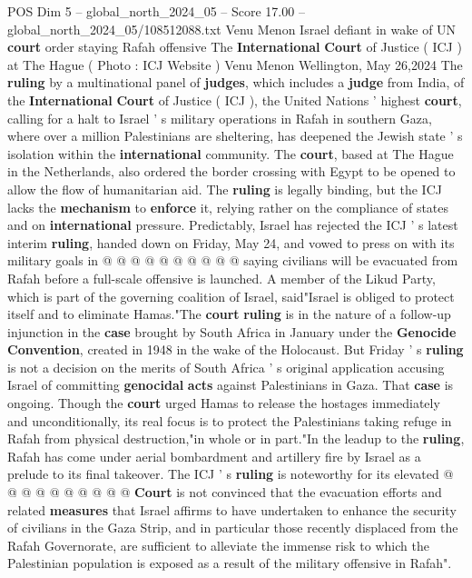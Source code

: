 \begin{textsample}{POS Dim 5 – global\_north\_2024\_05 – Score 17.00 – global\_north\_2024\_05/108512088.txt}  \label{ex:f5_pos_177}
Venu Menon Israel defiant in wake of UN \textbf{court} order staying Rafah offensive The \textbf{International} \textbf{Court} of Justice ( ICJ ) at The Hague ( Photo : ICJ Website ) Venu Menon Wellington, May 26,2024 The \textbf{ruling} by a multinational panel of \textbf{judges}, which includes a \textbf{judge} from India, of the \textbf{International} \textbf{Court} of Justice ( ICJ ), the United Nations ' highest \textbf{court}, calling for a halt to Israel ' s military operations in Rafah in southern Gaza, where over a million Palestinians are sheltering, has deepened the Jewish state ' s isolation within the \textbf{international} community.
The \textbf{court}, based at The Hague in the Netherlands, also ordered the border crossing with Egypt to be opened to allow the flow of humanitarian aid.
The \textbf{ruling} is legally binding, but the ICJ lacks the \textbf{mechanism} to \textbf{enforce} it, relying rather on the compliance of states and on \textbf{international} pressure.
Predictably, Israel has rejected the ICJ ' s latest interim \textbf{ruling}, handed down on Friday, May 24, and vowed to press on with its military goals in @ @ @ @ @ @ @ @ @ @ saying civilians will be evacuated from Rafah before a full-scale offensive is launched.
A member of the Likud Party, which is part of the governing coalition of Israel, said"Israel is obliged to protect itself and to eliminate Hamas."The \textbf{court} \textbf{ruling} is in the nature of a follow-up injunction in the \textbf{case} brought by South Africa in January under the \textbf{Genocide} \textbf{Convention}, created in 1948 in the wake of the Holocaust.
But Friday ' s \textbf{ruling} is not a decision on the merits of South Africa ' s original application accusing Israel of committing \textbf{genocidal} \textbf{acts} against Palestinians in Gaza.
That \textbf{case} is ongoing.
Though the \textbf{court} urged Hamas to release the hostages immediately and unconditionally, its real focus is to protect the Palestinians taking refuge in Rafah from physical destruction,"in whole or in part."In the leadup to the \textbf{ruling}, Rafah has come under aerial bombardment and artillery fire by Israel as a prelude to its final takeover.
The ICJ ' s \textbf{ruling} is noteworthy for its elevated @ @ @ @ @ @ @ @ @ @ \textbf{Court} is not convinced that the evacuation efforts and related \textbf{measures} that Israel affirms to have undertaken to enhance the security of civilians in the Gaza Strip, and in particular those recently displaced from the Rafah Governorate, are sufficient to alleviate the immense risk to which the Palestinian population is exposed as a result of the military offensive in Rafah".

\end{textsample}
